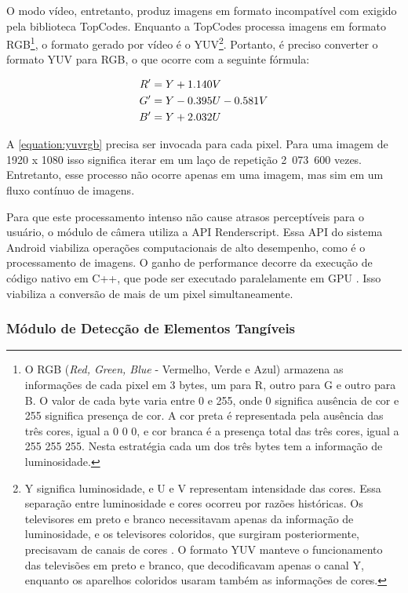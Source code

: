 O modo vídeo, entretanto, produz imagens em formato incompatível com exigido pela biblioteca TopCodes. Enquanto a TopCodes processa imagens em formato RGB\footnote{O RGB (\textit{Red, Green, Blue} - Vermelho, Verde e Azul) armazena as informações de cada pixel em 3 bytes, um para R, outro para G e outro para B. O valor de cada byte varia entre 0 e 255, onde 0 significa ausência de cor e 255 significa presença de cor. A cor preta é representada pela ausência das três cores, igual a 0 0 0, e cor branca é a presença total das três cores, igual a 255 255 255. Nesta estratégia cada um dos três bytes tem a informação de luminosidade.}, o formato gerado por vídeo é o YUV\footnote{Y significa luminosidade, e U e V representam intensidade das cores. Essa separação entre luminosidade e cores ocorreu por razões históricas. Os televisores em preto e branco necessitavam apenas da informação de luminosidade, e os televisores coloridos, que surgiram posteriormente, precisavam de canais de cores \cite{jack_video_2001}. O formato YUV manteve o funcionamento das televisões em preto e branco, que decodificavam apenas o canal Y, enquanto os aparelhos coloridos usaram também as informações de cores.
}. Portanto, é preciso converter o formato YUV para RGB, o que ocorre com a seguinte fórmula:

\begin{equation}
\label{equation:yuvrgb}
\centering
\begin{aligned}
R' &= Y + 1.140V \\
G' &= Y - 0.395U - 0.581V \\
B' &= Y + 2.032U
\end{aligned}
\end{equation}

A \autoref{equation:yuvrgb} precisa ser invocada para cada pixel. Para uma imagem de 1920 x 1080 isso significa iterar em um laço de repetição 2 073 600 vezes. Entretanto, esse processo não ocorre apenas em uma imagem, mas sim em um fluxo contínuo de imagens.

Para que este processamento intenso não cause atrasos perceptíveis para o usuário, o módulo de câmera utiliza a API Renderscript. Essa API do sistema Android viabiliza operações computacionais de alto desempenho, como é o processamento de imagens. O ganho de performance decorre da execução de código nativo em C++, que pode ser executado paralelamente em GPU \cite{sams_introducing_2011}. Isso viabiliza a conversão de mais de um pixel simultaneamente.

\subsubsection{Módulo de Detecção de Elementos Tangíveis}

